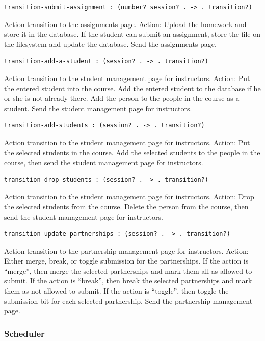 \documentclass[a4paper]{article}
\begin{document}
\begin{verbatim}
transition-submit-assignment : (number? session? . -> . transition?)
\end{verbatim}
Action transition to the assignments page.
Action: Upload the homework and store it in the database.
If the student can submit an assignment, store the file on the filesystem and
update the database. Send the assignments page.

\begin{verbatim}
transition-add-a-student : (session? . -> . transition?)
\end{verbatim}
Action transition to the student management page for instructors.
Action: Put the entered student into the course.
Add the entered student to the database if he or she is not already there. Add
the person to the people in the course as a student. Send the student
management page for instructors.

\begin{verbatim}
transition-add-students : (session? . -> . transition?)
\end{verbatim}
Action transition to the student management page for instructors.
Action: Put the selected students in the course.
Add the selected students to the people in the course, then send the student
management page for instructors.

\begin{verbatim}
transition-drop-students : (session? . -> . transition?)
\end{verbatim}
Action transition to the student management page for instructors.
Action: Drop the selected students from the course.
Delete the person from the course, then send the student management page for
instructors.

\begin{verbatim}
transition-update-partnerships : (session? . -> . transition?)
\end{verbatim}
Action transition to the partnership management page for instructors.
Action: Either merge, break, or toggle submission for the partnerships.
If the action is ``merge'', then merge the selected partnerships and mark them
all as allowed to submit. If the action is ``break'', then break the selected
partnerships and mark them as not allowed to submit. If the action is
``toggle'', then toggle the submission bit for each selected partnership. Send
the partnership management page.

\subsubsection{Scheduler}\label{subsubsec:scheduler}
\end{document}
